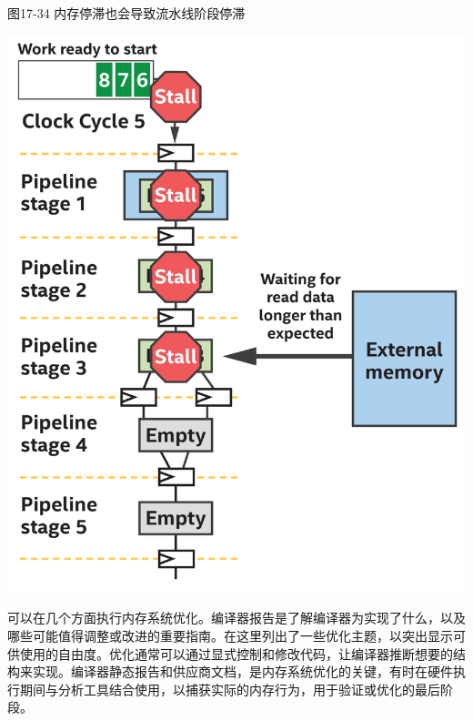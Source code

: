 \hspace*{\fill} \par %
图17-34 内存停滞也会导致流水线阶段停滞
\begin{center}
	\includegraphics[width=1.0\textwidth]{content/chapter-17/images/26}
\end{center}

可以在几个方面执行内存系统优化。编译器报告是了解编译器为实现了什么，以及哪些可能值得调整或改进的重要指南。在这里列出了一些优化主题，以突出显示可供使用的自由度。优化通常可以通过显式控制和修改代码，让编译器推断想要的结构来实现。编译器静态报告和供应商文档，是内存系统优化的关键，有时在硬件执行期间与分析工具结合使用，以捕获实际的内存行为，用于验证或优化的最后阶段。\par

